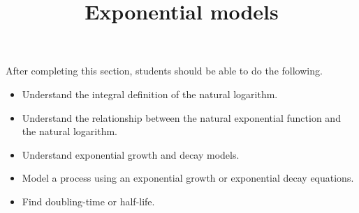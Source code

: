 \documentclass{ximera}
\title{Exponential models}
\begin{document}
\begin{abstract}
\end{abstract}

\maketitle

\begin{sectionOutcomes}

After completing this section, students should be able to do the following.

\begin{itemize}
\item Understand the integral definition of the natural logarithm.
\item Understand the relationship between the natural exponential
  function and the natural logarithm.
\item Understand exponential growth and decay models.
\item Model a process using an exponential growth or exponential
  decay equations.
\item Find doubling-time or half-life.
\end{itemize}

\end{sectionOutcomes}
\end{document}
